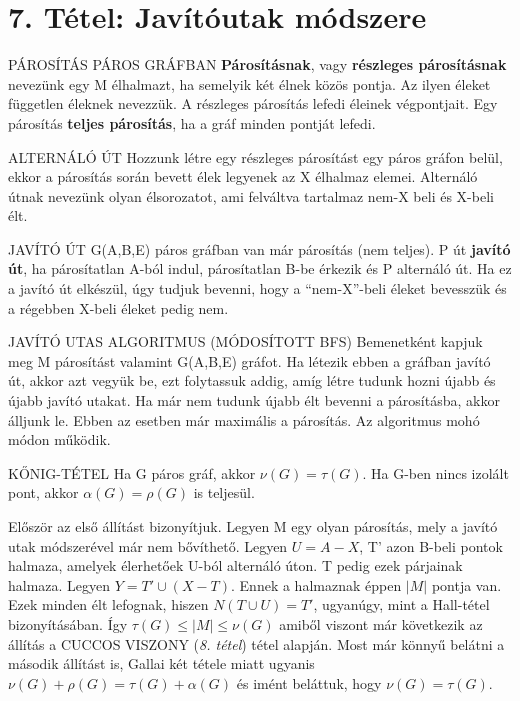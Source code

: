 \section{7. Tétel: Javítóutak módszere}

\begin{definicio}{PÁROSÍTÁS PÁROS GRÁFBAN}
\textbf{Párosításnak}, vagy \textbf{részleges párosításnak} nevezünk egy M élhalmazt, ha semelyik két élnek közös pontja. Az ilyen éleket független éleknek nevezzük. A részleges párosítás lefedi éleinek végpontjait. Egy párosítás \textbf{teljes párosítás}, ha a gráf minden pontját lefedi.
\end{definicio}

\begin{definicio}{ALTERNÁLÓ ÚT}
Hozzunk létre egy részleges párosítást egy páros gráfon belül, ekkor a párosítás során bevett élek legyenek az X élhalmaz elemei. Alternáló útnak nevezünk olyan élsorozatot, ami felváltva tartalmaz nem-X beli és X-beli élt.
\end{definicio}

\begin{definicio}{JAVÍTÓ ÚT}
G(A,B,E) páros gráfban van már párosítás (nem teljes). P út \textbf{javító út}, ha párosítatlan A-ból indul, párosítatlan B-be érkezik és P alternáló út. Ha ez a javító út elkészül, úgy tudjuk bevenni, hogy a ``nem-X''-beli éleket bevesszük és a régebben X-beli éleket pedig nem.
\end{definicio}

\begin{definicio}{JAVÍTÓ UTAS ALGORITMUS (MÓDOSÍTOTT BFS)}
Bemenetként kapjuk meg M párosítást valamint G(A,B,E) gráfot. Ha létezik ebben a gráfban javító út, akkor azt vegyük be, ezt folytassuk addig, amíg létre tudunk hozni újabb és újabb javító utakat. Ha már nem tudunk újabb élt bevenni a párosításba, akkor álljunk le. Ebben az esetben már maximális a párosítás. Az algoritmus mohó módon működik.
\end{definicio}

\begin{tetel}{KŐNIG-TÉTEL}
Ha G páros gráf, akkor $\nu(G) = \tau(G)$. Ha G-ben nincs izolált pont, akkor $\alpha(G) = \rho(G)$ is teljesül.
\end{tetel}

\begin{bizonyitas}{}
Először az első állítást bizonyítjuk. Legyen M egy olyan párosítás, mely a javító utak módszerével már nem bővíthető. Legyen $U = A - X$, T' azon B-beli pontok halmaza, amelyek élerhetőek U-ból alternáló úton. T pedig ezek párjainak halmaza. Legyen $Y = T' \cup (X - T)$. Ennek a halmaznak éppen $|M|$ pontja van. Ezek minden élt lefognak, hiszen $N(T\cup U) = T'$, ugyanúgy, mint a Hall-tétel bizonyításában. Így $\tau(G) \leq |M| \leq \nu(G)$ amiből viszont már következik az állítás a CUCCOS VISZONY (\textit{8. tétel}) tétel alapján. Most már könnyű belátni a második állítást is, Gallai két tétele miatt ugyanis $\nu(G) + \rho(G) = \tau(G) + \alpha(G)$ és imént beláttuk, hogy $\nu(G) = \tau(G)$.
\end{bizonyitas}

